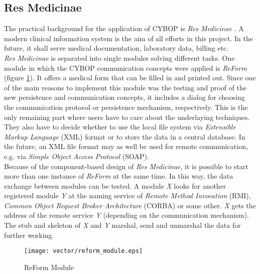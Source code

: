 %
%
%
%
%
%
%

\subsection{Res Medicinae}
\label{res_medicinae_heading}

The practical background for the application of CYBOP is \emph{Res Medicinae}
\cite{resmedicinae}. A modern clinical information system is the aim of all
efforts in this project. In the future, it shall serve medical documentation,
laboratory data, billing etc.\\
\emph{Res Medicinae} is separated into single modules solving different tasks.
One module in which the CYBOP communication concepts were applied is \emph{ReForm}
(figure \ref{reform_module_figure}). It offers a medical form that can be filled
in and printed out. Since one of the main reasons to implement this module was
the testing and proof of the new persistence and communication concepts, it
includes a dialog for choosing the communication protocol or persistence mechanism,
respectively. This is the only remaining part where users have to care about the
underlaying techniques. They also have to decide whether to use the local file
system via \emph{Extensible Markup Language} (XML) format or to store the data
in a central database. In the future, an XML file format may as well be used for
remote communication, e.g. via \emph{Simple Object Access Protocol} (SOAP).\\
Because of the component-based design of \emph{Res Medicinae}, it is possible
to start more than one instance of \emph{ReForm} at the same time. In this way,
the data exchange between modules can be tested.
A module \emph{X} looks for another registered module \emph{Y} at the naming service
of \emph{Remote Method Invocation} (RMI), \emph{Common Object Request Broker
Architecture} (CORBA) or some other. \emph{X} gets the address of the remote service
\emph{Y} (depending on the communication mechanism). The stub and skeleton of
\emph{X} and \emph{Y} marshal, send and unmarshal the data for further working.

\begin{figure}[ht]
    \begin{center}
        \texttt{[image: vector/reform\_module.eps]}
        \caption{ReForm Module}
        \label{reform_module_figure}
    \end{center}
\end{figure}

